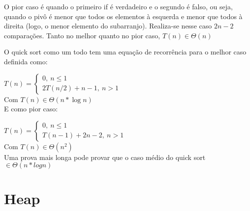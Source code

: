 \documentclass[a4paper, twocolumn]{article}
\theoremstyle{definition}
\begin{document}
O pior caso é quando o primeiro if é verdadeiro e o segundo é falso, ou seja, quando o pivô é menor que todos os elementos à esquerda e menor que todos à direita (logo, o menor elemento do subarranjo). Realiza-se nesse caso $2n-2$ comparações. Tanto no melhor quanto no pior caso, $T(n) \in \Theta(n)$

O quick sort como um todo tem uma equação de recorrência para o melhor caso definida como:

$T(n) = \begin{cases} 
	0, \ n \leq 1\\
	2T(n/2) + n-1, \ n > 1
\end{cases}$ \\
Com $T(n) \in \Theta(n* \log n)$ \\

E como pior caso:

$T(n) = \begin{cases} 
	0, \ n \leq 1\\
	T(n-1) + 2n-2, \ n > 1
\end{cases}$ \\
Com $T(n) \in \Theta(n^2)$\\

Uma prova mais longa pode provar que o caso médio do quick sort $\in \Theta(n* log n)$

\section{Heap }
\end{document}
